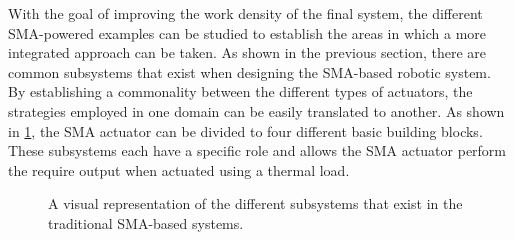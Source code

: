 With the goal of improving the work density of the final system, the different SMA-powered examples can be studied to establish the areas in which a more integrated approach can be taken. As shown in the previous section, there are common subsystems that exist when designing the SMA-based robotic system. By establishing a commonality between the different types of actuators, the strategies employed in one domain can be easily translated to another. As shown in \cref{fig:hexahon-base-layer}, the SMA actuator can be divided to four different basic building blocks. These subsystems each have a specific role and allows the SMA actuator perform the require output when actuated using a thermal load.

\begin{figure}[hbt] %
  \centering
  \caption{A visual representation of the different subsystems that exist in the traditional SMA-based systems.}
  \label{fig:hexahon-base-layer}
\end{figure}

